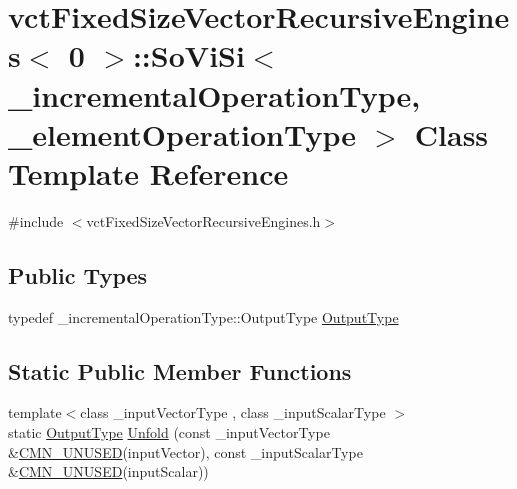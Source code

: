 \hypertarget{classvct_fixed_size_vector_recursive_engines_3_010_01_4_1_1_so_vi_si}{}\section{vct\+Fixed\+Size\+Vector\+Recursive\+Engines$<$ 0 $>$\+:\+:So\+Vi\+Si$<$ \+\_\+incremental\+Operation\+Type, \+\_\+element\+Operation\+Type $>$ Class Template Reference}
\label{classvct_fixed_size_vector_recursive_engines_3_010_01_4_1_1_so_vi_si}


{\ttfamily \#include $<$vct\+Fixed\+Size\+Vector\+Recursive\+Engines.\+h$>$}

\subsection*{Public Types}
\begin{DoxyCompactItemize}
\item 
typedef \+\_\+incremental\+Operation\+Type\+::\+Output\+Type \hyperlink{classvct_fixed_size_vector_recursive_engines_3_010_01_4_1_1_so_vi_si_a70b81b3e115af7d2eae3f8ce4e2cbf8d}{Output\+Type}
\end{DoxyCompactItemize}
\subsection*{Static Public Member Functions}
\begin{DoxyCompactItemize}
\item 
{\footnotesize template$<$class \+\_\+input\+Vector\+Type , class \+\_\+input\+Scalar\+Type $>$ }\\static \hyperlink{classvct_fixed_size_vector_recursive_engines_3_010_01_4_1_1_so_vi_si_a70b81b3e115af7d2eae3f8ce4e2cbf8d}{Output\+Type} \hyperlink{classvct_fixed_size_vector_recursive_engines_3_010_01_4_1_1_so_vi_si_aac9cebf0381d8506372963e26ed99ee9}{Unfold} (const \+\_\+input\+Vector\+Type \&\hyperlink{cmn_portability_8h_a021894e2626935fa2305434b1e893ff6}{C\+M\+N\+\_\+\+U\+N\+U\+S\+E\+D}(input\+Vector), const \+\_\+input\+Scalar\+Type \&\hyperlink{cmn_portability_8h_a021894e2626935fa2305434b1e893ff6}{C\+M\+N\+\_\+\+U\+N\+U\+S\+E\+D}(input\+Scalar))
\end{DoxyCompactItemize}


